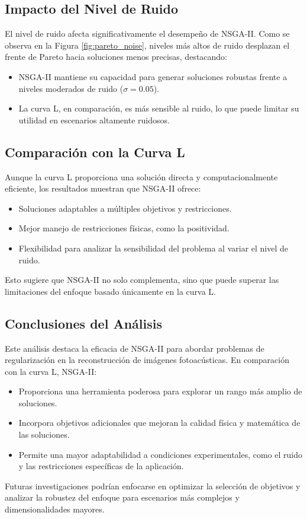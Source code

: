 \subsection{Impacto del Nivel de Ruido} \label{sec:analysis:noise}
El nivel de ruido afecta significativamente el desempeño de NSGA-II. Como se observa en la Figura \ref{fig:pareto_noise}, niveles más altos de ruido desplazan el frente de Pareto hacia soluciones menos precisas, destacando:
\begin{itemize}
    \item NSGA-II mantiene su capacidad para generar soluciones robustas frente a niveles moderados de ruido (\( \sigma = 0.05 \)).
    \item La curva L, en comparación, es más sensible al ruido, lo que puede limitar su utilidad en escenarios altamente ruidosos.
\end{itemize}

\subsection{Comparación con la Curva L} \label{sec:analysis:lcurve}
Aunque la curva L proporciona una solución directa y computacionalmente eficiente, los resultados muestran que NSGA-II ofrece:
\begin{itemize}
    \item Soluciones adaptables a múltiples objetivos y restricciones.
    \item Mejor manejo de restricciones físicas, como la positividad.
    \item Flexibilidad para analizar la sensibilidad del problema al variar el nivel de ruido.
\end{itemize}

Esto sugiere que NSGA-II no solo complementa, sino que puede superar las limitaciones del enfoque basado únicamente en la curva L.

\subsection{Conclusiones del Análisis} \label{sec:analysis:conclusions}
Este análisis destaca la eficacia de NSGA-II para abordar problemas de regularización en la reconstrucción de imágenes fotoacústicas. En comparación con la curva L, NSGA-II:
\begin{itemize}
    \item Proporciona una herramienta poderosa para explorar un rango más amplio de soluciones.
    \item Incorpora objetivos adicionales que mejoran la calidad física y matemática de las soluciones.
    \item Permite una mayor adaptabilidad a condiciones experimentales, como el ruido y las restricciones específicas de la aplicación.
\end{itemize}

Futuras investigaciones podrían enfocarse en optimizar la selección de objetivos y analizar la robustez del enfoque para escenarios más complejos y dimensionalidades mayores.
